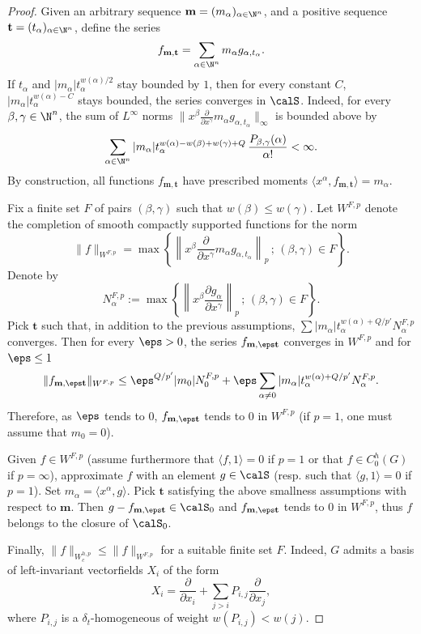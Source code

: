 \begin{proof}
Given an arbitrary sequence $\mathbf{m}=(m_\alpha)_{\alpha\in\N^n}$, and a positive sequence $\mathbf{t}=(t_\alpha)_{\alpha\in\N^n}$, define the series
\[
f_{\mathbf{m},\mathbf{t}}=\sum_{\alpha\in\N^n}m_\alpha g_{\alpha,t_\alpha}.
\]
If $t_\alpha$ and $|m_\alpha| t_\alpha^{w(\alpha)/2}$ stay bounded by $1$, then for every constant $C$, $|m_\alpha| t_\alpha^{w(\alpha)-C}$ stays bounded, the series converges in $\calS$. Indeed, for every $\beta,\gamma\in\N^n$, the sum of $L^\infty$ norms $\|x^\beta \frac{\partial }{\partial x^{\gamma}}m_\alpha g_{\alpha,t_\alpha}\|_{\infty}$ is bounded above by
\[
\sum_{\alpha\in\N^n}|m_\alpha| t_\alpha^{w(\alpha)-w(\beta)+w(\gamma)+Q}\,\frac{P_{\beta,\gamma} (\alpha)}{\alpha!} <\infty.
\]
By construction, all functions $f_{\mathbf{m},\mathbf{t}}$ have prescribed moments $\langle x^\alpha,f_{\mathbf{m},\mathbf{t}}\rangle=m_\alpha$.

Fix a finite set $F$ of pairs $(\beta,\gamma)$ such that $w(\beta)\leq w(\gamma)$. Let $W^{F,p}$ denote the completion of smooth compactly supported functions for the norm
\[
\|f\|_{W^{F,p}}=\max\left\{\left\|x^\beta \frac{\partial }{\partial x^{\gamma}}m_\alpha g_{\alpha,t_\alpha} \right\|_{p}\,;\,(\beta,\gamma)\in F\right\}.
\]
Denote by
\[
N^{F,p}_\alpha :=\max\left\{\left\|x^\beta \frac{\partial g_{\alpha}}{\partial x^{\gamma}}\right\|_{p} \,;\,(\beta,\gamma)\in F\right\}.
\]
Pick $\mathbf{t}$ such that, in addition to the previous assumptions, $\sum|m_\alpha|t_\alpha^{w(\alpha)+Q/p'}N^{F,p}_\alpha$ converges. Then for every $\eps>0$, the series $f_{\mathbf{m},\eps\mathbf{t}}$ converges in $W^{F,p}$ and for $\eps \leq 1$
\[
\|f_{\mathbf{m},\eps \mathbf{t}}\|_{W^{F,p}}\leq
\eps^{Q/p'}|m_0|N^{F,p}_0 + \eps \sum_{\alpha\not=0} |m_\alpha|t_\alpha^{w(\alpha)+Q/p'} N^{F,p}_\alpha.
\]
Therefore, as $\eps$ tends to $0$, $f_{\mathbf{m},\eps\mathbf{t}}$ tends to $0$ in $W^{F,p}$ (if $p=1$, one must assume that $m_0=0$).

Given $f\in W^{F,p}$ (assume furthermore that $\langle f,1 \rangle=0$ if $p=1$ or that $f\in C_0^h(G)$ if $p=\infty$), approximate $f$ with an element $g\in\calS$ (resp. such that $\langle g,1 \rangle=0$ if $p=1$). Set $m_\alpha=\langle x^\alpha,g \rangle$. Pick $\mathbf{t}$ satisfying the above smallness assumptions with respect to $\mathbf{m}$. Then $g-f_{\mathbf{m},\eps\mathbf{t}}\in \calS_0$ and $f_{\mathbf{m},\eps\mathbf{t}}$ tends to $0$ in $W^{F,p}$, thus $f$ belongs to the closure of $\calS_0$.

Finally, $\|f\|_{W_c^{h,p}}\leq \|f\|_{W^{F,p}}$ for a suitable finite set $F$. Indeed, $G$ admits a basis of left-invariant vectorfields $X_i$ of the form
\begin{equation}\label{eq:13}
X_i=\frac{\partial}{\partial x_i}+\sum_{j>i}P_{i,j}
\frac{\partial}{\partial x_j},
\end{equation}
where $P_{i,j}$ is a $\delta_t$-homogeneous of weight $w(P_{i,j})<w(j)$.
\end{proof}

